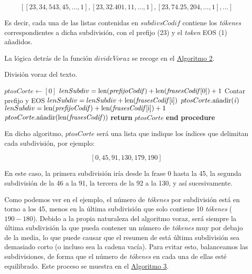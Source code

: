 \vspace{-0.5cm}

\[ [[23, 34, 543, 45, ..., 1], [23, 32. 401, 11, ..., 1], [23, 74. 25, 204, ..., 1], ...] \]

Es decir, cada una de las listas contenidas en $subdivsCodif$ contiene los \emph{tókenes} correspondientes a dicha subdivisión, con el prefijo (23) y el \emph{token} EOS (1) añadidos.
	
La lógica detrás de la función $divideVoraz$ se recoge en el \hyperref[alg:divide-voraz]{Algoritmo 2}.

\begin{algorithm}
	\caption{División voraz del texto.}\label{alg:divide-voraz}
	\begin{algorithmic}[1]
		\State $ptosCorte \gets [0]$
		\State $lenSubdiv = \text{len(\textit{prefijoCodif})} + \text{len(\textit{frasesCodif}[0])} + 1$ \Comment Contar prefijo y EOS
			\State $lenSubdiv = lenSubdiv + \text{len(\textit{frasesCodif}[i])}$
				\State $ptosCorte.\text{añadir(\textit{i})}$
				\State $lenSubdiv = \text{len(\textit{prefijoCodif})} + \text{len(\textit{frasesCodif}[i])} + 1$
			\EndIf
		\EndFor
		\State $ptosCorte.\text{añadir(len(\textit{frasesCodif}))}$
		\State \textbf{return} $ptosCorte$
		\State \hspace{-0.5cm}\textbf{end procedure}
		\EndProcedure
	\end{algorithmic}
\end{algorithm}

En dicho algoritmo, $ptosCorte$ será una lista que indique los índices que delimitan cada subdivisión, por ejemplo:

\vspace{-0.5cm}

\[ [0, 45, 91, 130, 179, 190] \]

En este caso, la primera subdivisión iría desde la frase 0 hasta la 45, la segunda subdivisión de la 46 a la 91, la tercera de la 92 a la 130, y así sucesivamente.

Como podemos ver en el ejemplo, el número de \emph{tókenes} por subdivisión está en torno a los 45, menos en la última subdivisión que solo contiene 10 \emph{tókenes} ($190-180$). Debido a la propia naturaleza del algoritmo voraz, será siempre la última subdivisión la que pueda contener un número de \emph{tókenes} muy por debajo de la media, lo que puede causar que el resumen de está última subdivisión sea demasiado corto (o incluso sea la cadena vacía). Para evitar esto, balanceamos las subdivisiones, de forma que el número de \emph{tókenes} en cada una de ellas esté equilibrado. Este proceso se muestra en el \hyperref[alg:balancea-subdivs]{Algoritmo 3}.


